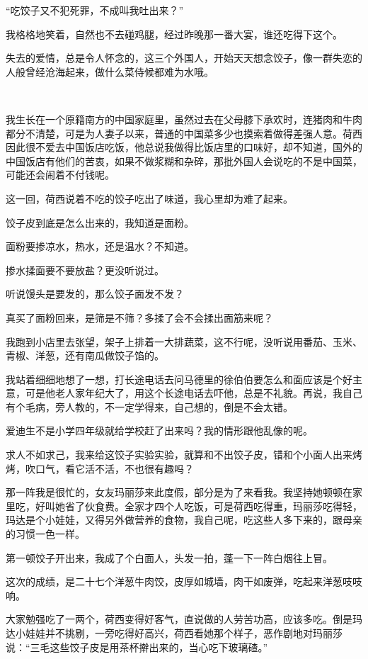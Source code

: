\par “吃饺子又不犯死罪，不成叫我吐出来？”
\par 我格格地笑着，自然也不去碰鸡腿，经过昨晚那一番大宴，谁还吃得下这个。
\par 失去的爱情，总是令人怀念的，这三个外国人，开始天天想念饺子，像一群失恋的人般曾经沧海起来，做什么菜侍候都难为水哦。
\par  
\par 我生长在一个原籍南方的中国家庭里，虽然过去在父母膝下承欢时，连猪肉和牛肉都分不清楚，可是为人妻子以来，普通的中国菜多少也摸索着做得差强人意。荷西因此很不爱去中国饭店吃饭，他总说我做得比饭店里的口味好，却不知道，国外的中国饭店有他们的苦衷，如果不做浆糊和杂碎，那批外国人会说吃的不是中国菜，可能还会闹着不付钱呢。
\par 这一回，荷西说着不吃的饺子吃出了味道，我心里却为难了起来。
\par 饺子皮到底是怎么出来的，我知道是面粉。
\par 面粉要掺凉水，热水，还是温水？不知道。
\par 掺水揉面要不要放盐？更没听说过。
\par 听说馒头是要发的，那么饺子面发不发？
\par 真买了面粉回来，是筛是不筛？多揉了会不会揉出面筋来呢？
\par 我跑到小店里去张望，架子上排着一大排蔬菜，这不行呢，没听说用番茄、玉米、青椒、洋葱，还有南瓜做饺子馅的。
\par 我站着细细地想了一想，打长途电话去问马德里的徐伯伯要怎么和面应该是个好主意，可是他老人家年纪大了，用这个长途电话去吓他，总是不礼貌。再说，我自己有个毛病，旁人教的，不一定学得来，自己想的，倒是不会太错。
\par 爱迪生不是小学四年级就给学校赶了出来吗？我的情形跟他乱像的呢。
\par 求人不如求己，我来给这饺子实验实验，就算和不出饺子皮，错和个小面人出来烤烤，吹口气，看它活不活，不也很有趣吗？
\par 那一阵我是很忙的，女友玛丽莎来此度假，部分是为了来看我。我坚持她顿顿在家里吃，好叫她省了伙食费。全家才四个人吃饭，可是荷西吃得重，玛丽莎吃得轻，玛达是个小娃娃，又得另外做营养的食物，我自己呢，吃这些人多下来的，跟母亲的习惯一色一样。
\par 第一顿饺子开出来，我成了个白面人，头发一拍，蓬一下一阵白烟往上冒。
\par 这次的成绩，是二十七个洋葱牛肉饺，皮厚如城墙，肉干如废弹，吃起来洋葱吱吱响。
\par 大家勉强吃了一两个，荷西变得好客气，直说做的人劳苦功高，应该多吃。倒是玛达小娃娃并不挑剔，一旁吃得好高兴，荷西看她那个样子，恶作剧地对玛丽莎说：“三毛这些饺子皮是用茶杯擀出来的，当心吃下玻璃碴。”
